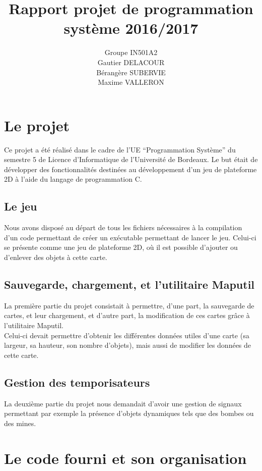 \documentclass{report}
\title{Rapport projet de programmation système 2016/2017}
\author{Groupe IN501A2\\Gautier DELACOUR\\Bérangère SUBERVIE\\Maxime VALLERON}
\begin{document}
\maketitle
\tableofcontents

\chapter{Le projet}
Ce projet a été réalisé dans le cadre de l'UE ``Programmation Système'' du semestre 5 de Licence d'Informatique de l'Université de Bordeaux. Le but était de développer des fonctionnalités destinées au développement d'un jeu de plateforme 2D à l'aide du langage de programmation C.

\section{Le jeu}
Nous avons disposé au départ de tous les fichiers nécessaires à la compilation d'un code permettant de créer un exécutable permettant de lancer le jeu. Celui-ci se présente comme une jeu de plateforme 2D, où il est possible d'ajouter ou d'enlever des objets à cette carte.

\section{Sauvegarde, chargement, et l'utilitaire Maputil}
La première partie du projet consistait à permettre, d'une part, la sauvegarde de cartes, et leur chargement, et d'autre part, la modification de ces cartes grâce à l'utilitaire Maputil.\\
Celui-ci devait permettre d'obtenir les différentes données utiles d'une carte (sa largeur, sa hauteur, son nombre d'objets), mais aussi de modifier les données de cette carte.

\section{Gestion des temporisateurs}
La deuxième partie du projet nous demandait d'avoir une gestion de signaux permettant par exemple la présence d'objets dynamiques tels que des bombes ou des mines.

\chapter{Le code fourni et son organisation}
\setcounter{section}{0}
\end{document}
